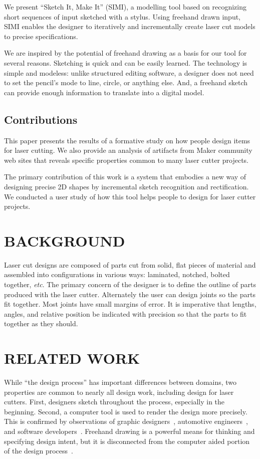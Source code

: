 \documentclass{article}
\begin{document}
We present ``Sketch It, Make It'' (SIMI), a modelling tool based on
recognizing short sequences of input sketched with a stylus. Using
freehand drawn input, SIMI enables the designer to iteratively and
incrementally create laser cut models to precise specifications.

We are inspired by the potential of freehand drawing as a basis for
our tool for several reasons. Sketching is quick and can be easily
learned. The technology is simple and modeless: unlike structured
editing software, a designer does not need to set the pencil's mode to
line, circle, or anything else. And, a freehand sketch can provide
enough information to translate into a digital model.

\subsection{Contributions}

This paper presents the results of a formative study on how people
design items for laser cutting. We also provide an analysis of
artifacts from Maker community web sites that reveals specific
properties common to many laser cutter projects.

The primary contribution of this work is a system that embodies a new
way of designing precise 2D shapes by incremental sketch recognition
and rectification. We conducted a user study of how this tool helps
people to design for laser cutter projects.

\section{BACKGROUND}

Laser cut designs are composed of parts cut from solid, flat pieces of
material and assembled into configurations in various ways: laminated,
notched, bolted together, \textit{etc}. The primary concern of the
designer is to define the outline of parts produced with the laser
cutter. Alternately the user can design joints so the parts fit
together. Most joints have small margins of error. It is imperative
that lengths, angles, and relative position be indicated with
precision so that the parts to fit together as they should.

\section{RELATED WORK}

While ``the design process'' has important differences between
domains, two properties are common to nearly all design work,
including design for laser cutters. First, designers sketch throughout
the process, especially in the beginning. Second, a computer tool is
used to render the design more precisely. This is confirmed by
observations of graphic designers~\cite{wong-rr-prototypes},
automotive engineers~\cite{kara-styling}, and software
developers~\cite{dekel-improvised-notation}. Freehand drawing is a
powerful means for thinking and specifying design intent, but it is
disconnected from the computer aided portion of the design
process~\cite{company-sketching-in-engineering}.
\end{document}
